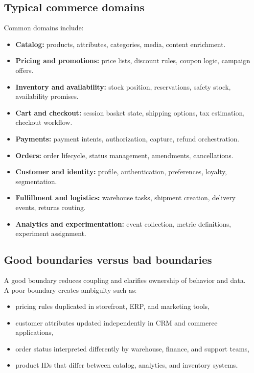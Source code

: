 \subsection{Typical commerce domains}
Common domains include:
\begin{itemize}
  \item \textbf{Catalog:} products, attributes, categories, media, content enrichment.
  \item \textbf{Pricing and promotions:} price lists, discount rules, coupon logic, campaign offers.
  \item \textbf{Inventory and availability:} stock position, reservations, safety stock, availability promises.
  \item \textbf{Cart and checkout:} session basket state, shipping options, tax estimation, checkout workflow.
  \item \textbf{Payments:} payment intents, authorization, capture, refund orchestration.
  \item \textbf{Orders:} order lifecycle, status management, amendments, cancellations.
  \item \textbf{Customer and identity:} profile, authentication, preferences, loyalty, segmentation.
  \item \textbf{Fulfillment and logistics:} warehouse tasks, shipment creation, delivery events, returns routing.
  \item \textbf{Analytics and experimentation:} event collection, metric definitions, experiment assignment.
\end{itemize}

\subsection{Good boundaries versus bad boundaries}
A good boundary reduces coupling and clarifies ownership of behavior and data.
A poor boundary creates ambiguity such as:
\begin{itemize}
  \item pricing rules duplicated in storefront, ERP, and marketing tools,
  \item customer attributes updated independently in CRM and commerce applications,
  \item order status interpreted differently by warehouse, finance, and support teams,
  \item product IDs that differ between catalog, analytics, and inventory systems.
\end{itemize}

